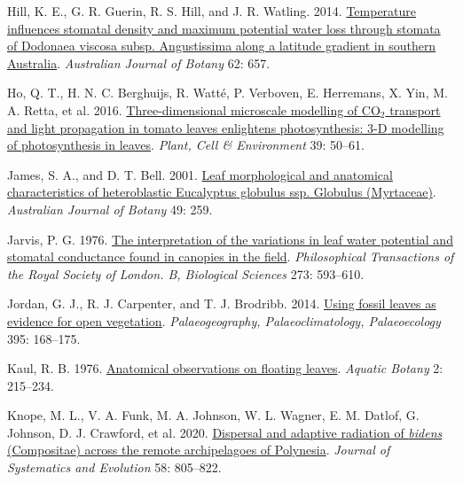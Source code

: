 \documentclass[
  letterpaper,
  DIV=11,
  numbers=noendperiod]{scrartcl}
\newlength{\cslhangindent}
\newlength{\cslentryspacingunit} %
\newenvironment{CSLReferences}[2] %
 {%
  \setlength{\parindent}{0pt}
  \ifodd #1
  \let\oldpar\par
  \def\par{\hangindent=\cslhangindent\oldpar}
  \fi
  \setlength{\parskip}{#2\cslentryspacingunit}
 }%
 {}
\begin{document}
\begin{CSLReferences}{1}{0}
\leavevmode{}%
Hill, K. E., G. R. Guerin, R. S. Hill, and J. R. Watling. 2014.
\href{https://doi.org/10.1071/BT14204}{Temperature influences stomatal
density and maximum potential water loss through stomata of {Dodonaea}
viscosa subsp. Angustissima along a latitude gradient in southern
{Australia}}. \emph{Australian Journal of Botany} 62: 657.

\leavevmode{}%
Ho, Q. T., H. N. C. Berghuijs, R. Watté, P. Verboven, E. Herremans, X.
Yin, M. A. Retta, et al. 2016.
\href{https://doi.org/10.1111/pce.12590}{Three-dimensional microscale
modelling of {CO}\(_{\textrm{2}}\) transport and light propagation in
tomato leaves enlightens photosynthesis: 3-{D} modelling of
photosynthesis in leaves}. \emph{Plant, Cell \& Environment} 39: 50--61.

\leavevmode{}%
James, S. A., and D. T. Bell. 2001.
\href{https://doi.org/10.1071/BT99044}{Leaf morphological and anatomical
characteristics of heteroblastic {Eucalyptus} globulus ssp. Globulus
({Myrtaceae})}. \emph{Australian Journal of Botany} 49: 259.

\leavevmode{}%
Jarvis, P. G. 1976. \href{https://doi.org/10.1098/rstb.1976.0035}{The
interpretation of the variations in leaf water potential and stomatal
conductance found in canopies in the field}. \emph{Philosophical
Transactions of the Royal Society of London. B, Biological Sciences}
273: 593--610.

\leavevmode{}%
Jordan, G. J., R. J. Carpenter, and T. J. Brodribb. 2014.
\href{https://doi.org/10.1016/j.palaeo.2013.12.035}{Using fossil leaves
as evidence for open vegetation}. \emph{Palaeogeography,
Palaeoclimatology, Palaeoecology} 395: 168--175.

\leavevmode{}%
Kaul, R. B. 1976.
\href{https://doi.org/10.1016/0304-3770(76)90022-X}{Anatomical
observations on floating leaves}. \emph{Aquatic Botany} 2: 215--234.

\leavevmode{}%
Knope, M. L., V. A. Funk, M. A. Johnson, W. L. Wagner, E. M. Datlof, G.
Johnson, D. J. Crawford, et al. 2020.
\href{https://doi.org/10.1111/jse.12704}{Dispersal and adaptive
radiation of \emph{bidens} ({Compositae}) across the remote
archipelagoes of {Polynesia}}. \emph{Journal of Systematics and
Evolution} 58: 805--822.


\end{CSLReferences}
\end{document}

